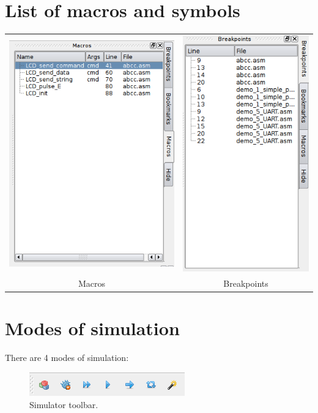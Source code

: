 \section{List of macros and symbols}
    \begin{table}[h!]
        \begin{tabular}{cc}
            \includegraphics[width=.33\textwidth]{img/macro_panel.png}
                &
            \includegraphics[width=.33\textwidth]{img/right_panel.png}
                \\
            Macros & Breakpoints
        \end{tabular}
    \end{table}

    
\section{Modes of simulation}
    There are 4 modes of simulation:

    \begin{figure}[h!]
        \centering{}
        \includegraphics[width=.4\textwidth]{img/simulation_panel.png}
        \caption{Simulator toolbar.}
    \end{figure}
    
